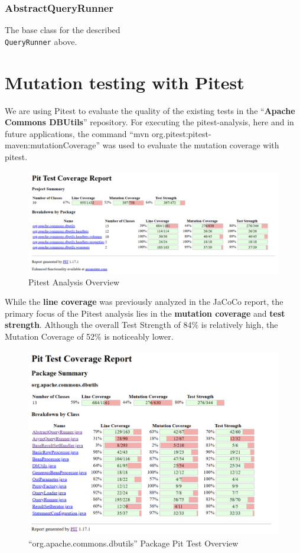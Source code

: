 \documentclass[sigconf]{acmart}
\begin{document}
\subsubsection*{\textbf{AbstractQueryRunner}}

The base class for the described \\ \texttt{QueryRunner} above.

\section{Mutation testing with Pitest}
We are using Pitest to evaluate the quality of the existing tests in the “\textbf{Apache Commons DBUtils}” repository. For executing the pitest-analysis, here and in future applications, the command “mvn org.pitest:pitest-maven:mutationCoverage” was used to evaluate the mutation coverage with pitest.

\begin{figure}[H]
    \centering
    \includegraphics[width=1\linewidth]{images/pitest1.png}
    \caption{Pitest Analysis Overview}

\end{figure}

While the \textbf{line coverage} was previously analyzed in the JaCoCo report, the primary focus of the Pitest analysis lies in the \textbf{mutation coverage} and \textbf{test strength}. Although the overall Test Strength of 84\% is relatively high, the Mutation Coverage of 52\% is noticeably lower.

\begin{figure}[H]
    \centering
    \includegraphics[width=1\linewidth]{images/pitest2.png}
    \caption{“org.apache.commons.dbutils” Package Pit Test Overview}
\end{figure}
\end{document}
